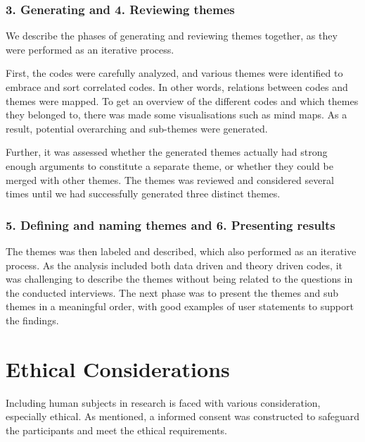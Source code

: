 \subsubsection{3. Generating and 4. Reviewing themes}
We describe the phases of generating and reviewing themes together, as they were performed as an iterative process. 

First, the codes were carefully analyzed, and various themes were identified to embrace and sort correlated codes. In other words, relations between codes and themes were mapped. To get an overview of the different codes and which themes they belonged to, there was made some visualisations such as mind maps. As a result, potential overarching and sub-themes were generated. 
    
Further, it was assessed whether the generated themes actually had strong enough arguments to constitute a separate theme, or whether they could be merged with other themes. The themes was reviewed and considered several times until we had successfully generated three distinct themes.

 \subsubsection{5. Defining and naming themes and 6. Presenting results}
The themes was then labeled and described, which also performed as an iterative process. As the analysis included both data driven and theory driven codes, it was challenging to describe the themes without being related to the questions in the conducted interviews. The next phase was to present the themes and sub themes in a meaningful order, with good examples of user statements to support the findings.  

\section{Ethical Considerations}
Including human subjects in research is faced with various consideration, especially ethical. As mentioned, a informed consent was constructed to safeguard the participants and meet the ethical requirements. 

